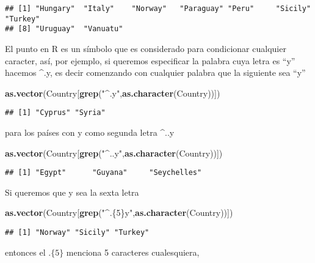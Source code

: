 \documentclass[]{article}
\newenvironment{Shaded}{\begin{snugshade}}{\end{snugshade}}
\newcommand{\KeywordTok}[1]{\textcolor[rgb]{0.13,0.29,0.53}{\textbf{#1}}}
\newcommand{\StringTok}[1]{\textcolor[rgb]{0.31,0.60,0.02}{#1}}
\newcommand{\NormalTok}[1]{#1}
\begin{document}
\begin{verbatim}
## [1] "Hungary"  "Italy"    "Norway"   "Paraguay" "Peru"     "Sicily"   "Turkey"  
## [8] "Uruguay"  "Vanuatu"
\end{verbatim}

El punto en R es un símbolo que es considerado para condicionar
cualquier caracter, así, por ejemplo, si queremos especificar la palabra
cuya letra es ``y'' hacemos \^{}.y, es decir comenzando con cualquier
palabra que la siguiente sea ``y''

\begin{Shaded}
\begin{Highlighting}[]
\KeywordTok{as.vector}\NormalTok{(Country[}\KeywordTok{grep}\NormalTok{(}\StringTok{"^.y"}\NormalTok{,}\KeywordTok{as.character}\NormalTok{(Country))])}
\end{Highlighting}
\end{Shaded}

\begin{verbatim}
## [1] "Cyprus" "Syria"
\end{verbatim}

para los países con y como segunda letra \^{}..y

\begin{Shaded}
\begin{Highlighting}[]
\KeywordTok{as.vector}\NormalTok{(Country[}\KeywordTok{grep}\NormalTok{(}\StringTok{"^..y"}\NormalTok{,}\KeywordTok{as.character}\NormalTok{(Country))])}
\end{Highlighting}
\end{Shaded}

\begin{verbatim}
## [1] "Egypt"      "Guyana"     "Seychelles"
\end{verbatim}

Si queremos que y sea la sexta letra

\begin{Shaded}
\begin{Highlighting}[]
\KeywordTok{as.vector}\NormalTok{(Country[}\KeywordTok{grep}\NormalTok{(}\StringTok{"^.\{5\}y"}\NormalTok{,}\KeywordTok{as.character}\NormalTok{(Country))])}
\end{Highlighting}
\end{Shaded}

\begin{verbatim}
## [1] "Norway" "Sicily" "Turkey"
\end{verbatim}

entonces el \(.\{5\}\) menciona 5 caracteres cualesquiera,
\end{document}
